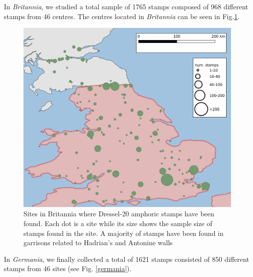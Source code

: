 \documentclass[review]{elsarticle}
\begin{document}
In \textit{Britannia}, we studied a total sample of 1765 stamps composed of 968 different stamps from 46 centres. The centres located in \textit{Britannia} can be seen in Fig.\ref{britannia}.
 
\begin{figure}[htp]
	\centering
\includegraphics[width=\linewidth]{figs/britannia}
\caption{Sites in Britannia where Dressel-20 amphoric stamps have been found. Each dot is a site while its size shows the sample size of stamps found in the site. A majority of stamps have been found in garrisons related to Hadrian's and Antonine walls}
\label{britannia}
\end{figure} 



In \textit{Germania}, we finally collected a total of 1621 stamps consisted of 850 different stamps from 46 sites (see Fig. \ref{germania}). 
\end{document}
